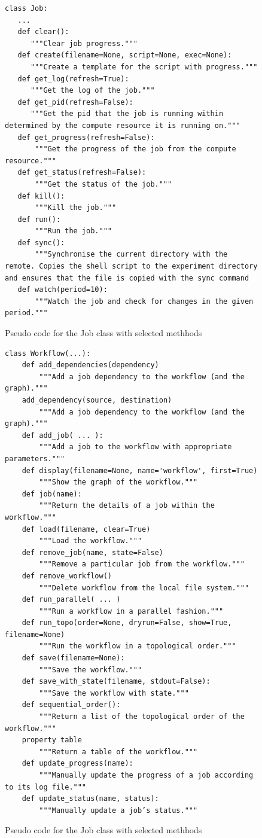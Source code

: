\begin{figure}[htb]
\caption{Pseudo code for the Job class with selected methhods}
\label{fig:code-job}
\begin{verbatim}
class Job:
   ...
   def clear():
      """Clear job progress."""
   def create(filename=None, script=None, exec=None):
      """Create a template for the script with progress."""
   def get_log(refresh=True):
      """Get the log of the job."""
   def get_pid(refresh=False):
      """Get the pid that the job is running within determined by the compute resource it is running on."""
   def get_progress(refresh=False):
       """Get the progress of the job from the compute resource."""
   def get_status(refresh=False):
       """Get the status of the job."""
   def kill():
       """Kill the job."""
   def run():
       """Run the job."""
   def sync():
       """Synchronise the current directory with the remote. Copies the shell script to the experiment directory and ensures that the file is copied with the sync command
   def watch(period=10):
       """Watch the job and check for changes in the given period."""

\end{verbatim}
\end{figure}

\begin{figure}[htb]
\caption{Pseudo code for the Job class with selected methhods}
\label{fig:code-workflow}
\begin{verbatim}
class Workflow(...):
    def add_dependencies(dependency)
        """Add a job dependency to the workflow (and the graph)."""
    add_dependency(source, destination)
        """Add a job dependency to the workflow (and the graph)."""
    def add_job( ... ):
        """Add a job to the workflow with appropriate parameters."""
    def display(filename=None, name='workflow', first=True)
        """Show the graph of the workflow."""
    def job(name):
        """Return the details of a job within the workflow."""
    def load(filename, clear=True)
        """Load the workflow."""
    def remove_job(name, state=False)
        """Remove a particular job from the workflow."""
    def remove_workflow()
        """Delete workflow from the local file system."""
    def run_parallel( ... )
        """Run a workflow in a parallel fashion."""
    def run_topo(order=None, dryrun=False, show=True, filename=None)
        """Run the workflow in a topological order."""
    def save(filename=None):
        """Save the workflow."""
    def save_with_state(filename, stdout=False):
        """Save the workflow with state."""
    def sequential_order():
        """Return a list of the topological order of the workflow."""
    property table
        """Return a table of the workflow."""
    def update_progress(name):
        """Manually update the progress of a job according to its log file."""
    def update_status(name, status):
        """Manually update a job’s status."""
\end{verbatim}
\end{figure}


